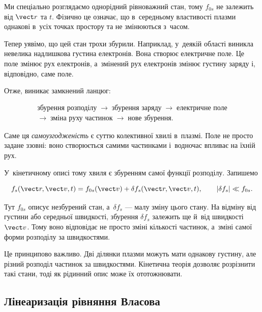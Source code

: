 Ми спеціально розглядаємо однорідний рівноважний стан, тому $f_{0s}$ не залежить від
$\vect r$ та $t$. Фізично це означає, що в~середньому властивості плазми однакові
в~усіх точках простору та не змінюються з~часом.

Тепер уявімо, що цей стан трохи збурили. Наприклад, у~деякій області виникла невелика
надлишкова густина електронів. Вона створює електричне поле. Це поле змінює рух
електронів, а~змінений рух електронів змінює густину заряду і, відповідно, саме поле.

Отже, виникає замкнений ланцюг:

\begin{equation*}
\begin{gathered}
\text{збурення розподілу}
\;\longrightarrow\;
\text{збурення заряду}
\;\longrightarrow\;
\text{електричне поле}\\
\longrightarrow\;
\text{зміна руху частинок}
\;\longrightarrow\;
\text{нове збурення}.
\end{gathered}
\end{equation*}

Саме ця \emph{самоузгодженість} є суттю колективної хвилі в~плазмі. Поле не просто
задане ззовні: воно створюється самими частинками і~водночас впливає на їхній рух.

У~кінетичному описі тому хвиля є збуренням самої функції розподілу. Запишемо

\begin{equation}\label{eq:kinetic-wave-perturbation}
f_s(\vect r,\vect v,t)
=
f_{0s}(\vect v)
+
\delta f_s(\vect r,\vect v,t),
\qquad
|\delta f_s|\ll f_{0s}.
\end{equation}

Тут $f_{0s}$ описує незбурений стан, а~$\delta f_s$ --- малу зміну цього стану.
На відміну від густини або середньої швидкості, збурення $\delta f_s$ залежить ще й~від
швидкості $\vect v$. Тому воно відповідає не просто зміні кількості частинок, а~зміні
самої форми розподілу за швидкостями.

Це принципово важливо. Дві ділянки плазми можуть мати однакову густину, але різний
розподіл частинок за швидкостями. Кінетична теорія дозволяє розрізнити такі стани,
тоді як рідинний опис може їх ототожнювати.

\subsection*{Лінеаризація рівняння Власова}

